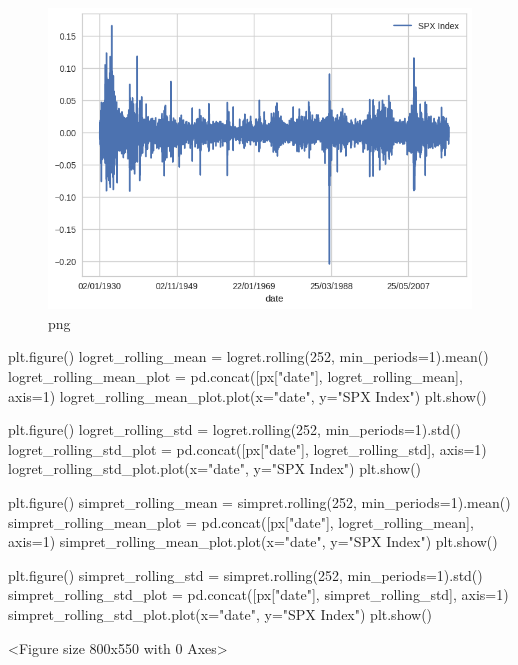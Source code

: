 \begin{figure}[h]
\centering
\includegraphics[scale=0.75]{ProcessingStockPriceData_files/ProcessingStockPriceData_7_2.png}
\caption{png}
\end{figure}

\begin{python}[language=Python]
plt.figure()
logret_rolling_mean = logret.rolling(252, min_periods=1).mean() 
logret_rolling_mean_plot = pd.concat([px["date"], logret_rolling_mean], axis=1)
logret_rolling_mean_plot.plot(x="date", y="SPX Index")
plt.show()

plt.figure()
logret_rolling_std = logret.rolling(252, min_periods=1).std() 
logret_rolling_std_plot = pd.concat([px["date"], logret_rolling_std], axis=1)
logret_rolling_std_plot.plot(x="date", y="SPX Index")
plt.show()

plt.figure()
simpret_rolling_mean = simpret.rolling(252, min_periods=1).mean() 
simpret_rolling_mean_plot = pd.concat([px["date"], logret_rolling_mean], axis=1)
simpret_rolling_mean_plot.plot(x="date", y="SPX Index")
plt.show()

plt.figure()
simpret_rolling_std = simpret.rolling(252, min_periods=1).std() 
simpret_rolling_std_plot = pd.concat([px["date"], simpret_rolling_std], axis=1)
simpret_rolling_std_plot.plot(x="date", y="SPX Index")
plt.show()
\end{python}

\begin{python}
<Figure size 800x550 with 0 Axes>
\end{python}

